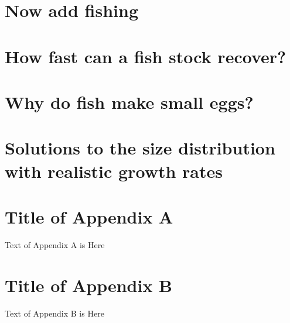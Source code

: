 \documentclass{article}
\begin{document}
\section{Now add fishing}\label{sec:Ex3}
\subsection{}\label{sec:Ex3A}

\newpage



\section{How fast can a fish stock recover?}\label{sec:Ex4}
\subsection{}\label{sec:Ex4A}

\newpage



\section{Why do fish make small eggs?}\label{sec:Ex5}
\subsection{}\label{sec:Ex5A}

\newpage



\section{Solutions to the size distribution with realistic growth rates}\label{sec:Ex6}
\subsection{}\label{sec:Ex6A}

\cleardoublepage
\appendix
\section{Title of Appendix A}

Text of Appendix A is Here

\section{Title of Appendix B}

Text of Appendix B is Here
\end{document}
